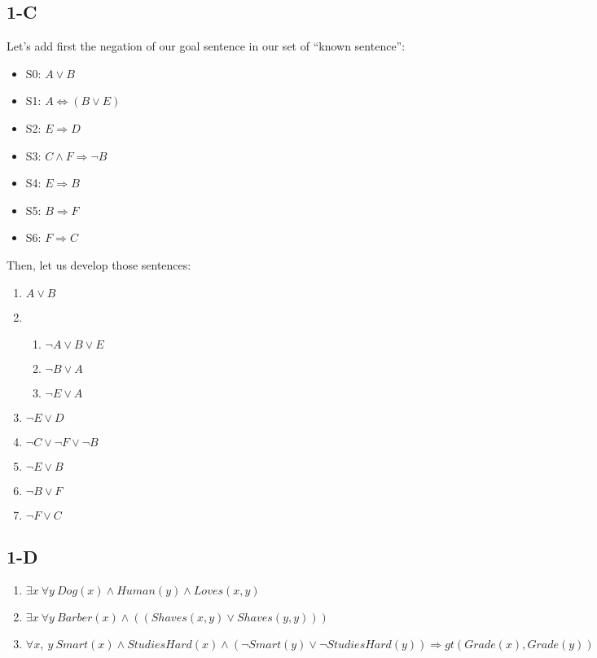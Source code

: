 \documentclass{article}
\begin{document}
        \subsection{1-C}
            Let's add first the negation of our goal sentence in our set of ``known sentence'':\\
            \begin{itemize}
                \item S0: $A\lor B$
                \item S1: $A \Leftrightarrow (B\lor E)$
                \item S2: $E\Rightarrow D$
                \item S3: $C\land F\Rightarrow \lnot B$
                \item S4: $E\Rightarrow B$
                \item S5: $B\Rightarrow F$
                \item S6: $F\Rightarrow C$
            \end{itemize}
            Then, let us develop those sentences:
            \begin{enumerate}
                \item $A\lor B$
                \item 
                    \begin{enumerate}
                        \item $\lnot A\lor B \lor E$
                        \item $\lnot B\lor A$
                        \item $\lnot E \lor A$
                    \end{enumerate} 
                \item $\lnot E \lor D$
                \item $\lnot C \lor \lnot F \lor \lnot B$
                \item $\lnot E \lor B$
                \item $\lnot B\lor F$
                \item $\lnot F\lor C$
            \end{enumerate}
        \subsection{1-D}
            \begin{enumerate}
                \item $\exists x\:\forall y\: Dog(x)\land Human(y)\land Loves(x, y)$
                \item $\exists x\: \forall y\: Barber(x)\land ((Shaves(x, y) \lor Shaves(y, y)))$
                \item $\forall x,\: y\: Smart(x)\land StudiesHard(x)\land (\lnot Smart(y)\lor \lnot StudiesHard(y)) \Rightarrow  gt(Grade(x), Grade(y))$
            \end{enumerate}
\end{document}
